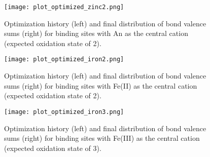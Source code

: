 \documentclass{article}
\begin{document}
\begin{figure}[h!]
\texttt{[image: plot\_optimized\_zinc2.png]}
\caption{Optimization history (left) and final distribution of bond valence sums (right) for binding sites with An as the central cation (expected oxidation state of 2).}
\end{figure}

\begin{figure}[h!]
\texttt{[image: plot\_optimized\_iron2.png]}
\caption{Optimization history (left) and final distribution of bond valence sums (right) for binding sites with Fe(II) as the central cation (expected oxidation state of 2).}
\end{figure}

\begin{figure}[h!]
\texttt{[image: plot\_optimized\_iron3.png]}
\caption{Optimization history (left) and final distribution of bond valence sums (right) for binding sites with Fe(III) as the central cation (expected oxidation state of 3).}
\end{figure}
\end{document}
